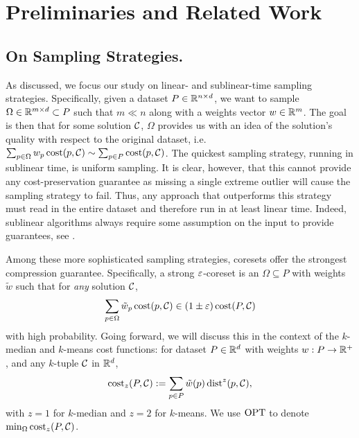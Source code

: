 \section{Preliminaries and Related Work}
\label{sec:preliminaries}

\subsection{On Sampling Strategies.}
\label{ssec:sens_sampling}

As discussed, we focus our study on linear- and sublinear-time sampling strategies. Specifically, given a dataset $P \in \mathbb{R}^{n \times d}$, we want to sample
$\Omega \in \mathbb{R}^{m \times d} \subset P$ such that $m \ll n$ along with a weights vector $w \in \mathbb{R}^m$. The goal is then that for some solution $\mathcal C$, $\Omega$
provides us with an idea of the solution's quality with respect to the original dataset, i.e. $\sum_{p \in \Omega} w_p \operatorname{cost}(p, \mathcal C) \sim \sum_{p \in P}
\operatorname{cost}(p, \mathcal C)$.  The quickest sampling strategy, running in sublinear time, is uniform sampling. It is clear, however, that this cannot provide any
cost-preservation guarantee as missing a single extreme outlier will cause the sampling strategy to fail. Thus, any approach that outperforms this strategy must
read in the entire dataset and therefore run in at least linear time. Indeed, sublinear algorithms always require some assumption on the input to provide
guarantees, see \cite{Ben-David07,czumaj2007sublinear,HJJ23,meyerson2004k}.


Among these more sophisticated sampling strategies, coresets offer the strongest compression guarantee. Specifically, a strong $\varepsilon$-coreset is an 
$\Omega
\subseteq P$ with weights $\tilde w$ such that for \emph{any} solution $\mathcal C$, \[\sum_{p \in \Omega} \tilde w_p \operatorname{cost}(p, \mathcal C) \in (1 \pm \varepsilon) \operatorname{cost}(P, \mathcal C)\] with
high probability.  Going forward, we will discuss this in the context of the $k$-median and $k$-means cost functions: for dataset $P \in \mathbb{R}^d$ with weights $w
: P \rightarrow \mathbb{R}^+$, and any $k$-tuple $\mathcal C$ in $\mathbb{R}^d$, \[\operatorname{cost}_z(P, \mathcal C) := \sum_{p \in P} \tilde w(p) \operatorname{dist}^z(p, \mathcal C),\] with
$z=1$ for $k$-median and $z=2$ for $k$-means. We use $\text{OPT}$ to denote $\min_{\Omega} \operatorname{cost}_z(P, \mathcal C)$.

